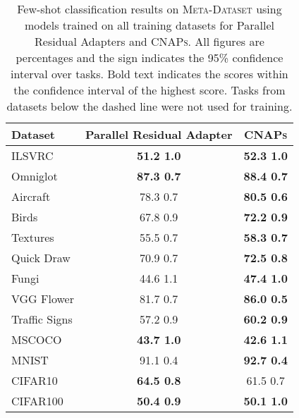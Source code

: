 \documentclass{article}
\theoremstyle{definition}
\newcommand{\cnaps}{\textsc{CNAPs}}
\begin{document}
\begin{table}[t]
    \caption{Few-shot classification results on \textsc{Meta-Dataset} \citep{triantafillou2019meta} using models trained on all training datasets for Parallel Residual Adapters \citep{rebuffi2018efficient} and \cnaps{}. All figures are percentages and the  sign indicates the 95\% confidence interval over tasks. Bold text indicates the scores within the confidence interval of the highest score. Tasks from datasets below the dashed line were not used for training.}
    \label{table:parallel_residual_adapter_comparison}
	\centering
	\begin{tabular}{lcc}
	\toprule
	Dataset                                   & Parallel Residual Adapter & \cnaps{} \\
    \midrule
	ILSVRC \citep{russakovsky2015imagenet}    & \textbf{51.2  1.0}   & \textbf{52.3  1.0} \\
	Omniglot \citep{lake2011one}              & \textbf{87.3  0.7}   & \textbf{88.4  0.7} \\
    Aircraft \citep{maji2013fine}             & 78.3  0.7            & \textbf{80.5  0.6} \\
    Birds \citep{wah2011caltech}              & 67.8  0.9            & \textbf{72.2  0.9} \\
    Textures \citep{cimpoi2014describing}     & 55.5  0.7            & \textbf{58.3  0.7} \\
    Quick Draw \citep{ha2017neural}           & 70.9  0.7            & \textbf{72.5  0.8} \\
    Fungi \citep{Schroeder2018FGVCx}          & 44.6  1.1            & \textbf{47.4  1.0} \\
    VGG Flower \citep{nilsback2008automated}  & 81.7  0.7            & \textbf{86.0  0.5} \\
	\hdashline
    Traffic Signs \citep{houben2013detection} & 57.2  0.9            & \textbf{60.2  0.9} \\ 
    MSCOCO \citep{lin2014microsoft}           & \textbf{43.7  1.0}   & \textbf{42.6  1.1} \\
    MNIST \citep{lecun2010mnist}              & 91.1  0.4            & \textbf{92.7  0.4} \\
    CIFAR10 \citep{krizhevsky2009learning}    & \textbf{64.5  0.8}   &         61.5  0.7 \\ 
    CIFAR100 \citep{krizhevsky2009learning}   & \textbf{50.4  0.9}   & \textbf{50.1  1.0} \\
    \bottomrule
\end{tabular}
\end{table}
\end{document}
